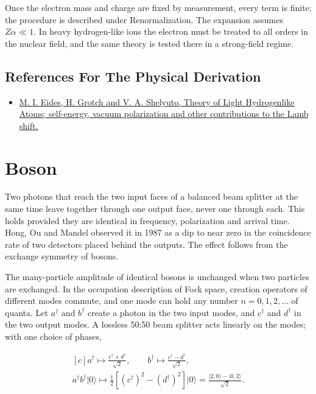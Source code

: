 \documentclass[11pt,oneside]{book}
\newenvironment{centeredalign}{\[\begin{gathered}[c]}{\end{gathered}\]}
\newcommand{\ket}[1]{\lvert #1\rangle}
\begin{document}
Once the electron mass and charge are fixed by measurement, every term is finite; the procedure is described under Renormalization. The expansion assumes \(Z\alpha\ll1\). In heavy hydrogen-like ions the electron must be treated to all orders in the nuclear field, and the same theory is tested there in a strong-field regime.

\subsection*{References For The Physical Derivation}
\begin{itemize}
\item \href{https://arxiv.org/abs/hep-ph/0002158}{M. I. Eides, H. Grotch and V. A. Shelyuto, Theory of Light Hydrogenlike Atoms; self-energy, vacuum polarization and other contributions to the Lamb shift.}
\end{itemize}





\clearpage

\section{Boson}

\label{topic:boson}

Two photons that reach the two input faces of a balanced beam splitter at the same time leave together through one output face, never one through each. This holds provided they are identical in frequency, polarization and arrival time. Hong, Ou and Mandel observed it in 1987 as a dip to near zero in the coincidence rate of two detectors placed behind the outputs. The effect follows from the exchange symmetry of bosons.

The many-particle amplitude of identical bosons is unchanged when two particles are exchanged. In the occupation description of Fock space, creation operators of different modes commute, and one mode can hold any number \(n=0,1,2,\dots\) of quanta. Let \(a^\dagger\) and \(b^\dagger\) create a photon in the two input modes, and \(c^\dagger\) and \(d^\dagger\) in the two output modes. A lossless 50:50 beam splitter acts linearly on the modes; with one choice of phases,

\begin{centeredalign}
a^\dagger\mapsto\frac{c^\dagger+d^\dagger}{\sqrt2},\qquad
b^\dagger\mapsto\frac{c^\dagger-d^\dagger}{\sqrt2},\\
a^\dagger b^\dagger\ket{0}\mapsto\frac12\left[(c^\dagger)^2-(d^\dagger)^2\right]\ket{0}
=\frac{\ket{2,0}-\ket{0,2}}{\sqrt2}.
\end{centeredalign}
\end{document}
